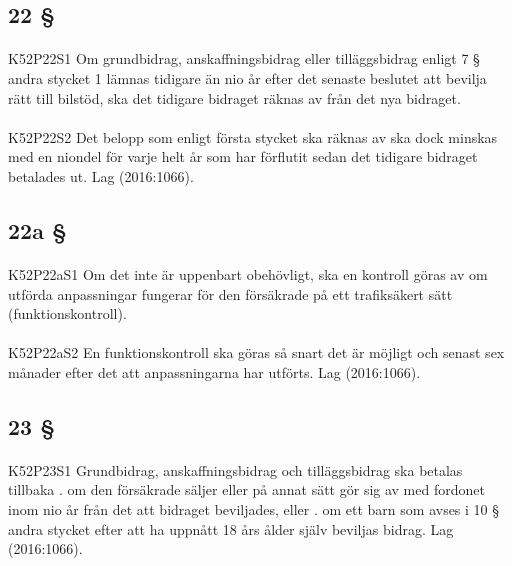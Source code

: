 \documentclass[a4paper,notitlepage,openany,10pt]{book}
\begin{document}
\subsection*{22 §}
\paragraph*{}
{\tiny K52P22S1}
Om grundbidrag, anskaffningsbidrag eller tilläggsbidrag enligt 7 § andra stycket 1 lämnas tidigare än nio år efter det senaste beslutet att bevilja rätt till bilstöd, ska det tidigare bidraget räknas av från det nya bidraget.
\paragraph*{}
{\tiny K52P22S2}
Det belopp som enligt första stycket ska räknas av ska dock minskas med en niondel för varje helt år som har förflutit sedan det tidigare bidraget betalades ut.
Lag (2016:1066).
\subsection*{22a §}
\paragraph*{}
{\tiny K52P22aS1}
Om det inte är uppenbart obehövligt, ska en kontroll göras av om utförda anpassningar fungerar för den försäkrade på ett trafiksäkert sätt (funktionskontroll).
\paragraph*{}
{\tiny K52P22aS2}
En funktionskontroll ska göras så snart det är möjligt och senast sex månader efter det att anpassningarna har utförts.
Lag (2016:1066).
\subsection*{23 §}
\paragraph*{}
{\tiny K52P23S1}
Grundbidrag, anskaffningsbidrag och tilläggsbidrag ska betalas tillbaka
. om den försäkrade säljer eller på annat sätt gör sig av med fordonet inom nio år från det att bidraget beviljades, eller
. om ett barn som avses i 10 § andra stycket efter att ha uppnått 18 års ålder själv beviljas bidrag.
Lag (2016:1066).
\end{document}

